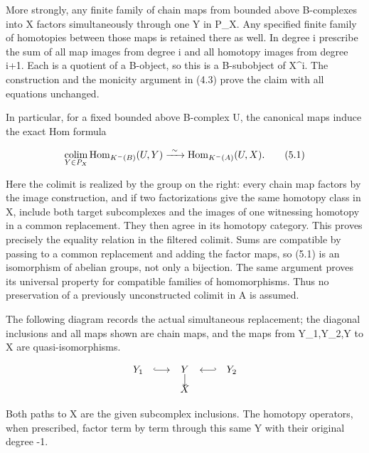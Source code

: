 More strongly,\allowbreak{} any finite family of chain maps from bounded above B-complexes into X factors simultaneously through one Y in P\_\allowbreak{}X. Any specified finite family of homotopies between those maps is retained there as well. In degree i prescribe the sum of all map images from degree i and all homotopy images from degree i\allowbreak{}+1. Each is a quotient of a B-object,\allowbreak{} so this is a B-subobject of X\^{}i. The construction and the monicity argument in (4.3)\allowbreak{} prove the claim with all equations unchanged.

In particular,\allowbreak{} for a fixed bounded above B-complex U,\allowbreak{} the canonical maps induce the exact Hom formula

\[
 \mathop{\rm colim}_{Y\in P_X}
       \operatorname{Hom}_{K^-(B)}(U,Y)
       \xrightarrow{\ \sim\ }
       \operatorname{Hom}_{K^-(A)}(U,X).                  \tag{5.1}
\]

Here the colimit is realized by the group on the right:\allowbreak{} every chain map factors by the image construction,\allowbreak{} and if two factorizations give the same homotopy class in X,\allowbreak{} include both target subcomplexes and the images of one witnessing homotopy in a common replacement. They then agree in its homotopy category. This proves precisely the equality relation in the filtered colimit. Sums are compatible by passing to a common replacement and adding the factor maps,\allowbreak{} so (5.1)\allowbreak{} is an isomorphism of abelian groups,\allowbreak{} not only a bijection. The same argument proves its universal property for compatible families of homomorphisms. Thus no preservation of a previously unconstructed colimit in A is assumed.

The following diagram records the actual simultaneous replacement; the diagonal inclusions and all maps shown are chain maps,\allowbreak{} and the maps from Y\_\allowbreak{}1,\allowbreak{}Y\_\allowbreak{}2,\allowbreak{}Y to X are quasi-isomorphisms.

\[
 \begin{array}{ccccc}
 Y_1&\lhook\joinrel\longrightarrow&Y&\longleftarrow\joinrel\rhook&Y_2\\[-2pt]
 &&\big\downarrow&&\\[-2pt]
 &&X&&
 \end{array}
\]

Both paths to X are the given subcomplex inclusions. The homotopy operators,\allowbreak{} when prescribed,\allowbreak{} factor term by term through this same Y with their original degree -1.

